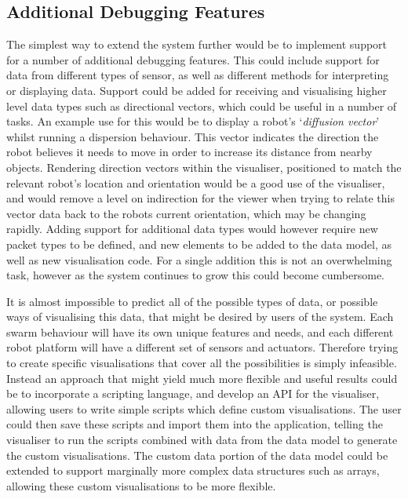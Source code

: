 
\subsection{Additional Debugging Features}

The simplest way to extend the system further would be to implement support for a number of additional debugging features. This could include support for data from different types of sensor, as well as different methods for interpreting or displaying data. Support could be added for receiving and visualising higher level data types such as directional vectors, which could be useful in a number of tasks. An example use for this would be to display a robot's `\textit{diffusion vector}' whilst running a dispersion behaviour. This vector indicates the direction the robot believes it needs to move in order to increase its distance from nearby objects. Rendering direction vectors within the visualiser, positioned to match the relevant robot's location and orientation would be a good use of the visualiser, and would remove a level on indirection for the viewer when trying to relate this vector data back to the robots current orientation, which may be changing rapidly. Adding support for additional data types would however require new packet types to be defined, and new elements to be added to the data model, as well as new visualisation code. For a single addition this is not an overwhelming task, however as the system continues to grow this could become cumbersome.

It is almost impossible to predict all of the possible types of data, or possible ways of visualising this data, that might be desired by users of the system. Each swarm behaviour will have its own unique features and needs, and each different robot platform will have a different set of sensors and actuators. Therefore trying to create specific visualisations that cover all the possibilities is simply infeasible. Instead an approach that might yield much more flexible and useful results could be to incorporate a scripting language, and develop an API for the visualiser, allowing users to write simple scripts which define custom visualisations. The user could then save these scripts and import them into the application, telling the visualiser to run the scripts combined with data from the data model to generate the custom visualisations. The custom data portion of the data model could be extended to support marginally more complex data structures such as arrays, allowing these custom visualisations to be more flexible.

